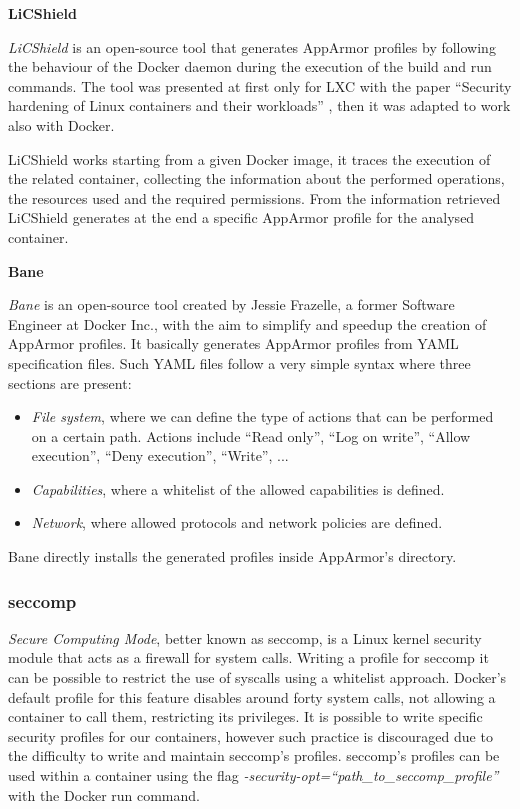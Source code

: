\documentclass[a4paper,12pt]{article}
\begin{document}
\bigbreak\textbf{LiCShield}\bigbreak 

\textit{LiCShield} \cite{licshield} is an open-source tool that generates
AppArmor profiles by following the behaviour of the Docker daemon during the
execution of the build and run commands. The tool was presented at first only
for LXC with the paper ``Security hardening of Linux containers and their
workloads'' \cite{licshield_paper}, then it was adapted to work also with
Docker. \par LiCShield works starting from a given Docker image, it traces the
execution of the related container, collecting the information about the
performed operations, the resources used and the required permissions. From the
information retrieved LiCShield generates at the end a specific AppArmor profile
for the analysed container. 

\bigbreak\textbf{Bane}\bigbreak 

\textit{Bane} \cite{bane_jesse_frazelle} is an open-source tool created by
Jessie Frazelle, a former Software Engineer at Docker Inc., with the aim to
simplify and speedup the creation of AppArmor profiles. It basically generates
AppArmor profiles from YAML specification files. Such YAML files follow a very
simple syntax where three sections are present:
\begin{itemize}
  \item \textit{File system}, where we can define the type of actions that can be
  performed on a certain path. Actions include ``Read only'', ``Log on write'',
  ``Allow execution'', ``Deny execution'', ``Write'', ...
  \item \textit{Capabilities}, where a whitelist of the allowed capabilities is
  defined. 
  \item \textit{Network}, where allowed protocols and network policies are
  defined.
\end{itemize}
Bane directly installs the generated profiles inside AppArmor's directory.  

\subsubsection{seccomp}

\textit{Secure Computing Mode}, better known as seccomp, is a Linux kernel security
module that acts as a firewall for system calls. Writing a profile for seccomp
it can be possible to restrict the use of syscalls using a whitelist approach.
Docker's default profile for this feature disables around forty system calls,
not allowing a container to call them, restricting its privileges. It is
possible to write specific security profiles for our containers, however such
practice is discouraged due to the difficulty to write and maintain seccomp's
profiles. seccomp's profiles can be used within a container using the flag
\textit{-security-opt=``path\_to\_seccomp\_profile''} with the Docker run command.
\end{document}
